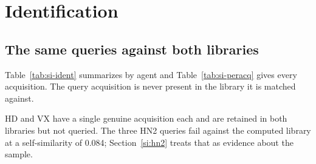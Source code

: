 \documentclass[11pt]{article}
\begin{document}
\clearpage

\section{Identification}
\label{si:ident}

\subsection{The same queries against both libraries}

Table~\ref{tab:si-ident} summarizes by agent and Table~\ref{tab:si-peracq} gives every
acquisition. The query acquisition is never present in the library it is matched against.

\begin{table}[htbp]
\centering
\caption{Identification of the same thirty genuine acquisitions against a measured and against a computed library, under identical preprocessing, an identical native grid and an identical cosine metric. The query acquisition is never present in the library it is matched against.}
\label{tab:si-ident}
\footnotesize
{}

\begin{flushleft}\footnotesize HD and VX have a single genuine acquisition each and are retained in both libraries but not queried. The three HN2 queries fail against the computed library at a self-similarity of 0.084; Section~\ref{si:hn2} treats that as evidence about the sample.\end{flushleft}
\end{table}
\end{document}
